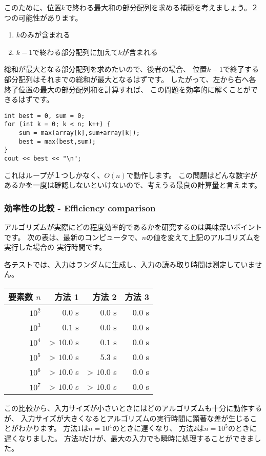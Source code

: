 このために、位置$k$で終わる最大和の部分配列を求める補題を考えましょう。２つの可能性があります。
\begin{enumerate}
\item $k$のみが含まれる
\item $k-1$で終わる部分配列に加えて$k$が含まれる
\end{enumerate}

総和が最大となる部分配列を求めたいので、後者の場合、
位置$k - 1$で終了する部分配列はそれまでの総和が最大となるはずです。
したがって、左から右へ各終了位置の最大の部分配列和を計算すれば、
この問題を効率的に解くことができるはずです。
\begin{lstlisting}
int best = 0, sum = 0;
for (int k = 0; k < n; k++) {
    sum = max(array[k],sum+array[k]);
    best = max(best,sum);
}
cout << best << "\n";
\end{lstlisting}

これはループが１つしかなく、$O(n)$で動作します。
この問題はどんな数字があるかを一度は確認しないといけないので、考えうる最良の計算量と言えます。

\subsubsection{効率性の比較 - Efficiency comparison}

アルゴリズムが実際にどの程度効率的であるかを研究するのは興味深いポイントです。
次の表は、最新のコンピュータで、$n$の値を変えて上記のアルゴリズムを実行した場合の
実行時間です。

各テストでは、入力はランダムに生成し、入力の読み取り時間は測定していません。

\begin{center}
\begin{tabular}{rrrr}
要素数 $n$ & 方法 1 & 方法 2 & 方法 3 \\
\hline
$10^2$ & $0.0$ s & $0.0$ s & $0.0$ s \\
$10^3$ & $0.1$ s & $0.0$ s & $0.0$ s \\
$10^4$ & > $10.0$ s & $0.1$ s & $0.0$ s \\
$10^5$ & > $10.0$ s & $5.3$ s & $0.0$ s \\
$10^6$ & > $10.0$ s & > $10.0$ s & $0.0$ s \\
$10^7$ & > $10.0$ s & > $10.0$ s & $0.0$ s \\
\end{tabular}
\end{center}

この比較から、入力サイズが小さいときにはどのアルゴリズムも十分に動作するが、
入力サイズが大きくなるとアルゴリズムの実行時間に顕著な差が生じることがわかります。
方法1は$n=10^4$のときに遅くなり、
方法2は$n=10^5$のときに遅くなりました。
方法3だけが、最大の入力でも瞬時に処理することができました。
